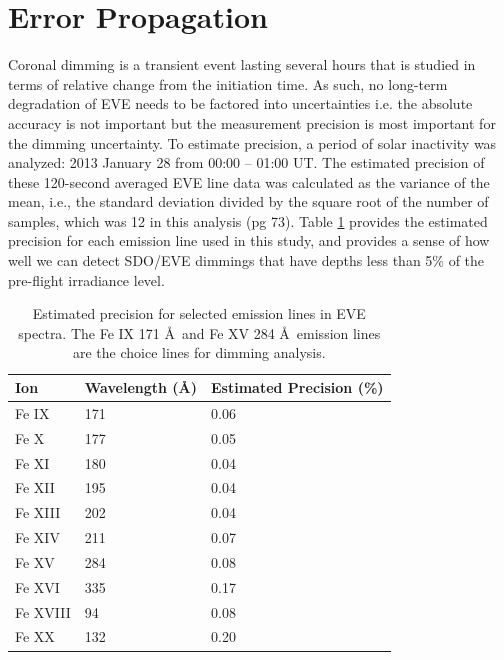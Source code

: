 \section{Error Propagation}
\label{sec:deconvolveerrors}
Coronal dimming is a transient event lasting several hours that is studied in terms of relative change from the initiation time. As such, no long-term degradation of EVE needs to be factored into uncertainties i.e. the absolute accuracy is not important but the measurement precision is most important for the dimming uncertainty. To estimate precision, a period of solar inactivity was analyzed: 2013 January 28 from 00:00 – 01:00 UT. The estimated precision of these 120-second averaged EVE line data was calculated as the variance of the mean, i.e., the standard deviation divided by the square root of the number of samples, which was 12 in this analysis \citep{Bevington1969} (pg 73). Table \ref{tab:evelineprecision} provides the estimated precision for each emission line used in this study, and provides a sense of how well we can detect SDO/EVE dimmings that have depths less than 5\% of the pre-flight irradiance level.

\begin{table}[!h]
    \caption[EVE precision by emission line]{
    Estimated precision for selected emission lines in EVE spectra. The Fe IX 171 \AA\ and Fe XV 284 \AA\ emission lines
    are the choice lines for dimming analysis.  
    }
    \begin{center}
    \begin{tabular}{|l|l|l|} \hline
	Ion & Wavelength (\AA) & Estimated Precision (\%) \\ \hline \hline
	Fe IX & 171 & 0.06 \\ \hline
	Fe X & 177 & 0.05  \\ \hline
	Fe XI & 180 & 0.04 \\ \hline
	Fe XII & 195 & 0.04 \\ \hline
	Fe XIII & 202 & 0.04 \\ \hline
	Fe XIV & 211 & 0.07 \\ \hline
	Fe XV & 284 & 0.08 \\ \hline
	Fe XVI & 335 & 0.17 \\ \hline
	Fe XVIII & 94 & 0.08 \\ \hline
	Fe XX & 132 & 0.20 \\ \hline
	\end{tabular}
    \\ \rule{0mm}{5mm}
    \end{center}
    \label{tab:evelineprecision}
\end{table}

